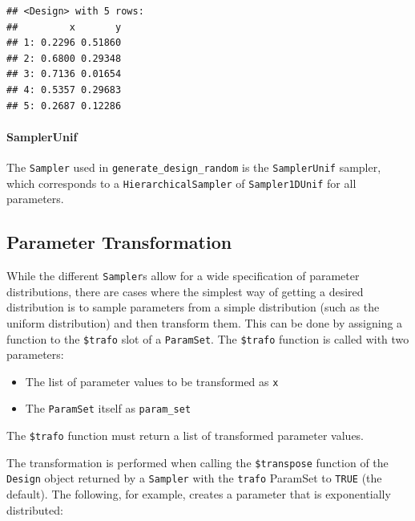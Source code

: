 \documentclass[
]{scrbook}
\providecommand{\tightlist}{%
  \setlength{\itemsep}{0pt}\setlength{\parskip}{0pt}}
\begin{document}
\begin{verbatim}
## <Design> with 5 rows:
##         x       y
## 1: 0.2296 0.51860
## 2: 0.6800 0.29348
## 3: 0.7136 0.01654
## 4: 0.5357 0.29683
## 5: 0.2687 0.12286
\end{verbatim}

\hypertarget{samplerunif}{%
\paragraph{SamplerUnif}\label{samplerunif}}

The \texttt{Sampler} used in \texttt{generate\_design\_random} is the \texttt{SamplerUnif} sampler, which corresponds to a \texttt{HierarchicalSampler} of \texttt{Sampler1DUnif} for all parameters.

\hypertarget{parameter-transformation}{%
\subsection{Parameter Transformation}\label{parameter-transformation}}

While the different \texttt{Sampler}s allow for a wide specification of parameter distributions, there are cases where the simplest way of getting a desired distribution is to sample parameters from a simple distribution (such as the uniform distribution) and then transform them.
This can be done by assigning a function to the \texttt{\$trafo} slot of a \texttt{ParamSet}.
The \texttt{\$trafo} function is called with two parameters:

\begin{itemize}
\tightlist
\item
  The list of parameter values to be transformed as \texttt{x}
\item
  The \texttt{ParamSet} itself as \texttt{param\_set}
\end{itemize}

The \texttt{\$trafo} function must return a list of transformed parameter values.

The transformation is performed when calling the \texttt{\$transpose} function of the \texttt{Design} object returned by a \texttt{Sampler} with the \texttt{trafo} ParamSet to \texttt{TRUE} (the default).
The following, for example, creates a parameter that is exponentially distributed:
\end{document}
